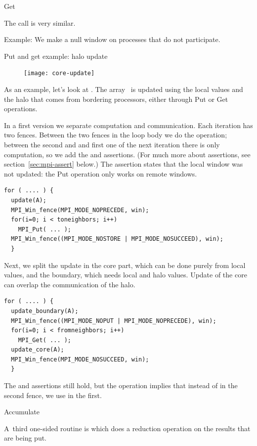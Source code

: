  {Get}

The  call is very similar.

Example:
%
%
We make a null window on processes that do not participate.
%

 {Put and get example: halo update}

\begin{figure}
  \texttt{[image: core-update]}
\end{figure}
%
As an example, let's look at .
The array~ is updated using the local values and the halo
that comes from bordering processors, either through Put or Get operations.

In a first version we separate computation and communication.
Each iteration has two fences. Between the two fences in the loop body
we do the  operation; between the second and and first one
of the next iteration there is only computation, so we add the
 and  assertions. (For much more about
assertions, see section~\ref{sec:mpi-assert} below.)
The  assertion
states that the local window was not updated: the Put operation only
works on remote windows.
\begin{lstlisting}
for ( .... ) {
  update(A); 
  MPI_Win_fence(MPI_MODE_NOPRECEDE, win); 
  for(i=0; i < toneighbors; i++) 
    MPI_Put( ... );
  MPI_Win_fence((MPI_MODE_NOSTORE | MPI_MODE_NOSUCCEED), win); 
  }
\end{lstlisting}

Next, we split the update in the core part, which can be done purely
from local values, and the boundary, which needs local and halo
values. Update of the core can overlap the communication of the halo.
\begin{lstlisting}
for ( .... ) {
  update_boundary(A); 
  MPI_Win_fence((MPI_MODE_NOPUT | MPI_MODE_NOPRECEDE), win); 
  for(i=0; i < fromneighbors; i++) 
    MPI_Get( ... );
  update_core(A); 
  MPI_Win_fence(MPI_MODE_NOSUCCEED, win); 
  }
\end{lstlisting}
The  and  assertions still hold, but the
 operation implies that instead of  in the
second fence, we use  in the first.

 {Accumulate}

A~third one-sided routine
is  which does a reduction operation on the results
that are being put.

